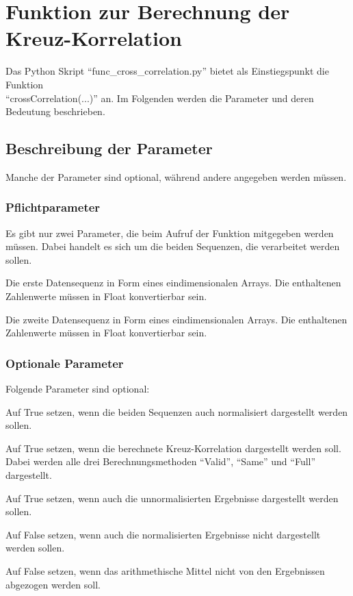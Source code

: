 
\chapter{Funktion zur Berechnung der Kreuz-Korrelation}
Das Python Skript \enquote{func\_cross\_correlation.py} bietet als Einstiegspunkt die Funktion\\ \mbox{\enquote{crossCorrelation(...)}} an. Im Folgenden werden die Parameter und deren Bedeutung beschrieben.

\section{Beschreibung der Parameter}
Manche der Parameter sind optional, während andere angegeben werden müssen.
\subsection{Pflichtparameter}
Es gibt nur zwei Parameter, die beim Aufruf der Funktion mitgegeben werden müssen. Dabei handelt es sich um die beiden Sequenzen, die verarbeitet werden sollen.
\begin{description}[style=nextline]
\item[seqA] Die erste Datensequenz in Form eines eindimensionalen Arrays. Die enthaltenen Zahlenwerte müssen in Float konvertierbar sein.
\item[seqB] Die zweite Datensequenz in Form eines eindimensionalen Arrays. Die enthaltenen Zahlenwerte müssen in Float konvertierbar sein.
\end{description}

\subsection{Optionale Parameter}
Folgende Parameter sind optional:
\begin{description}[style=nextline]
\item[plotNormalizedData] [Default: False] Auf True setzen, wenn die beiden Sequenzen auch normalisiert dargestellt werden sollen.
\item[plotCorrelations] [Default: False] Auf True setzen, wenn die berechnete Kreuz-Korrelation dargestellt werden soll. Dabei werden alle drei Berechnungsmethoden \enquote{Valid}, \enquote{Same} und \enquote{Full} dargestellt.
\item[plotNonNormalizedResults] [Default: False] Auf True setzen, wenn auch die unnormalisierten Ergebnisse dargestellt werden sollen.
\item[plotNormalizedResults] [Default: True] Auf False setzen, wenn auch die normalisierten Ergebnisse nicht dargestellt werden sollen.
\item[subtractMeanFromResult] [Default: True] Auf False setzen, wenn das arithmethische Mittel nicht von den Ergebnissen abgezogen werden soll.
\end{description}

